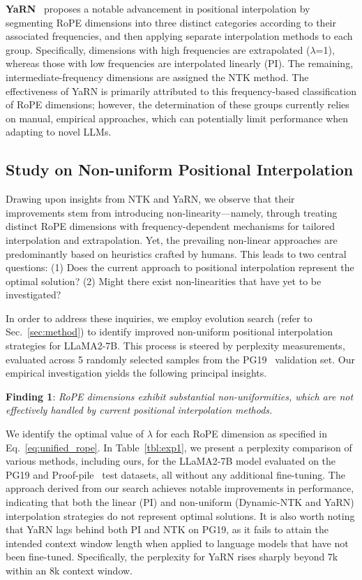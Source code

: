 \textbf{YaRN}~\cite{yarn} proposes a notable advancement in positional interpolation by segmenting RoPE dimensions into three distinct categories according to their associated frequencies, and then applying separate interpolation methods to each group. Specifically, dimensions with high frequencies are extrapolated ($\lambda$=1), whereas those with low frequencies are interpolated linearly (PI). The remaining, intermediate-frequency dimensions are assigned the NTK method. The effectiveness of YaRN is primarily attributed to this frequency-based classification of RoPE dimensions; however, the determination of these groups currently relies on manual, empirical approaches, which can potentially limit performance when adapting to novel LLMs.

\subsection{Study on Non-uniform Positional Interpolation}

Drawing upon insights from NTK and YaRN, we observe that their improvements stem from introducing non-linearity—namely, through treating distinct RoPE dimensions with frequency-dependent mechanisms for tailored interpolation and extrapolation. Yet, the prevailing non-linear approaches are predominantly based on heuristics crafted by humans. This leads to two central questions: (1) Does the current approach to positional interpolation represent the optimal solution? (2) Might there exist non-linearities that have yet to be investigated?

In order to address these inquiries, we employ evolution search (refer to Sec.~\ref{sec:method}) to identify improved non-uniform positional interpolation strategies for LLaMA2-7B. This process is steered by perplexity measurements, evaluated across 5 randomly selected samples from the PG19~\cite{pg19} validation set. Our empirical investigation yields the following principal insights.

\textbf{Finding 1}: \textit{RoPE dimensions exhibit substantial non-uniformities, which are not effectively handled by current positional interpolation methods.}

We identify the optimal value of $\lambda$ for each RoPE dimension as specified in Eq.~\ref{eq:unified_rope}. In Table~\ref{tbl:exp1}, we present a perplexity comparison of various methods, including ours, for the LLaMA2-7B model evaluated on the PG19 and Proof-pile~\cite{proof-pile} test datasets, all without any additional fine-tuning. The approach derived from our search achieves notable improvements in performance, indicating that both the linear (PI) and non-uniform (Dynamic-NTK and YaRN) interpolation strategies do not represent optimal solutions. It is also worth noting that YaRN lags behind both PI and NTK on PG19, as it fails to attain the intended context window length when applied to language models that have not been fine-tuned. Specifically, the perplexity for YaRN rises sharply beyond 7k within an 8k context window.


